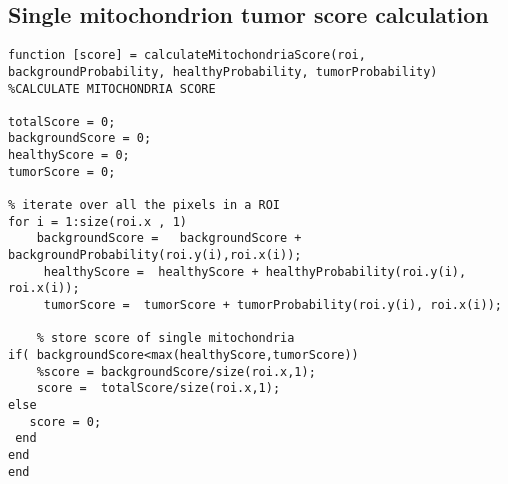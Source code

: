 \subsection{Single mitochondrion tumor score calculation}
\begin{lstlisting}
function [score] = calculateMitochondriaScore(roi, backgroundProbability, healthyProbability, tumorProbability)
%CALCULATE MITOCHONDRIA SCORE 

totalScore = 0;
backgroundScore = 0;
healthyScore = 0;
tumorScore = 0;

% iterate over all the pixels in a ROI 
for i = 1:size(roi.x , 1)
    backgroundScore =   backgroundScore +    backgroundProbability(roi.y(i),roi.x(i));
     healthyScore =  healthyScore + healthyProbability(roi.y(i), roi.x(i));
     tumorScore =  tumorScore + tumorProbability(roi.y(i), roi.x(i));
   
    % store score of single mitochondria 
if( backgroundScore<max(healthyScore,tumorScore))
    %score = backgroundScore/size(roi.x,1);
    score =  totalScore/size(roi.x,1);
else
   score = 0;
 end
end
end
\end{lstlisting}

